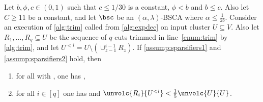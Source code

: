 \begin{lemma}
	\label{lem:boundsequencetrim}
	Let $b, \phi,c \in (0,1)$ such that $c \leq 1/30$ is a constant, $\phi < b$ and $b \le c$. Also let $C \ge 11$ be a constant, and let $\bsc$ be an $(\alpha,\lambda)$-BSCA where $\alpha \le \frac{1}{2b}$. Consider an execution of \cref{alg:trim} called from \cref{alg:expdec} on input cluster $U \subseteq V$. Also let $R_1,\dots,R_q \subseteq U$ be the sequence of $q$ cuts trimmed in line~\eqref{enum:trim} by \cref{alg:trim}, and let $U^{<i}=U \setminus (\cup_{z-1}^{i-1}R_z)$. If \cref{assump:sparsifiers1} and \cref{assump:sparsifiers2} hold, then
	\begin{enumerate}
		\item \label{satprec:sparse} for all  with , one has ,
		\item \label{satprec:balsparse} for all $i \in [q]$ one has  and $ \unvolc{R_i}{U^{<i}} < \frac{1}{5}\unvolc{U}{U}$.
	\end{enumerate}
\end{lemma}
